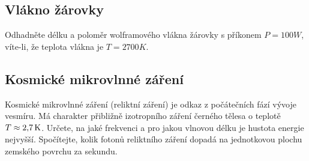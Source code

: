\subsection{Vlákno žárovky}
    Odhadněte délku a poloměr wolframového vlákna žárovky s příkonem $P=100\unit{W}$, víte-li, že teplota vlákna je $T=2700\unit{K}$.

\subsection{Kosmické mikrovlnné záření}
    Kosmické mikrovlnné záření (reliktní záření) je odkaz z počátečních fází vývoje vesmíru.
    Má charakter přibližně izotropního záření černého tělesa o teplotě $T\approx2,\!7\,\mathrm{{K}}$.
    Určete, na jaké frekvenci a pro jakou vlnovou délku je hustota energie nejvyšší.
    Spočítejte, kolik fotonů reliktního záření dopadá na jednotkovou plochu zemského povrchu za sekundu.